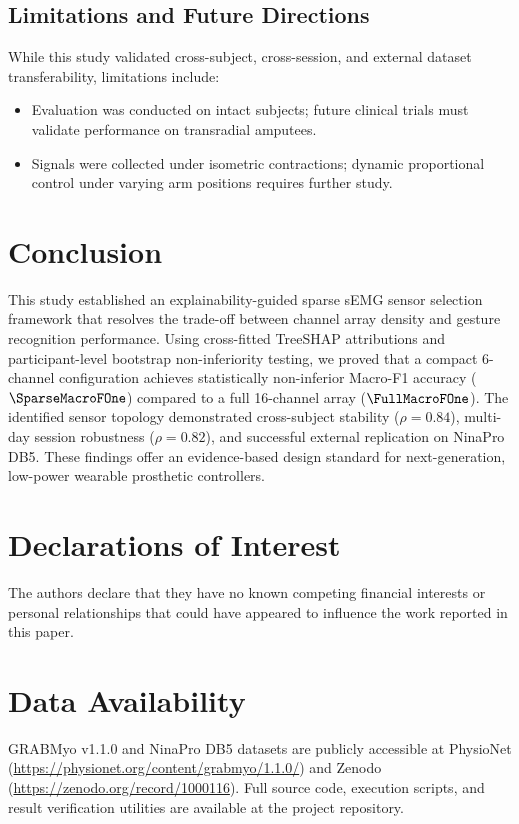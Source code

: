 \documentclass[final,5p,times,twocolumn]{elsarticle}
\begin{document}
\subsection{Limitations and Future Directions}
While this study validated cross-subject, cross-session, and external dataset transferability, limitations include:
\begin{itemize}
    \item Evaluation was conducted on intact subjects; future clinical trials must validate performance on transradial amputees.
    \item Signals were collected under isometric contractions; dynamic proportional control under varying arm positions requires further study.
\end{itemize}

\section{Conclusion}
This study established an explainability-guided sparse sEMG sensor selection framework that resolves the trade-off between channel array density and gesture recognition performance. Using cross-fitted TreeSHAP attributions and participant-level bootstrap non-inferiority testing, we proved that a compact 6-channel configuration achieves statistically non-inferior Macro-F1 accuracy ($\SparseMacroFOne$) compared to a full 16-channel array ($\FullMacroFOne$). The identified sensor topology demonstrated cross-subject stability ($\rho = 0.84$), multi-day session robustness ($\rho = 0.82$), and successful external replication on NinaPro DB5. These findings offer an evidence-based design standard for next-generation, low-power wearable prosthetic controllers.

\section*{Declarations of Interest}
The authors declare that they have no known competing financial interests or personal relationships that could have appeared to influence the work reported in this paper.

\section*{Data Availability}
GRABMyo v1.1.0 and NinaPro DB5 datasets are publicly accessible at PhysioNet (\url{https://physionet.org/content/grabmyo/1.1.0/}) and Zenodo (\url{https://zenodo.org/record/1000116}). Full source code, execution scripts, and result verification utilities are available at the project repository.



\end{document}
